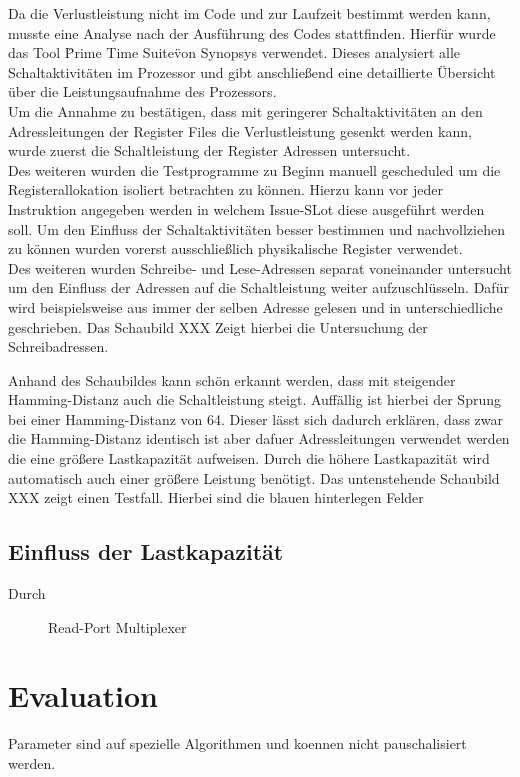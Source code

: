 Da die Verlustleistung nicht im Code und zur Laufzeit bestimmt werden kann, musste eine Analyse nach der Ausführung des Codes stattfinden. Hierfür wurde das Tool \"Prime Time Suite\" von Synopsys verwendet. Dieses analysiert alle Schaltaktivitäten im Prozessor und gibt anschließend eine detaillierte Übersicht über die Leistungsaufnahme des Prozessors.\\
Um die Annahme zu bestätigen, dass mit geringerer Schaltaktivitäten an den Adressleitungen der Register Files die Verlustleistung gesenkt werden kann, wurde zuerst die Schaltleistung der Register Adressen untersucht.\\
Des weiteren wurden die Testprogramme zu Beginn manuell gescheduled um die Registerallokation isoliert betrachten zu können. Hierzu kann vor jeder Instruktion angegeben werden in welchem Issue-SLot diese ausgeführt werden soll. Um den Einfluss der Schaltaktivitäten besser bestimmen und nachvollziehen zu können wurden vorerst ausschließlich physikalische Register verwendet. \\
Des weiteren wurden Schreibe- und Lese-Adressen separat voneinander untersucht um den Einfluss der Adressen auf die Schaltleistung weiter aufzuschlüsseln. Dafür wird beispielsweise aus immer der selben Adresse gelesen und in unterschiedliche geschrieben. Das Schaubild XXX Zeigt hierbei die Untersuchung der Schreibadressen.

%	
Anhand des Schaubildes kann schön erkannt werden, dass mit steigender Hamming-Distanz auch die Schaltleistung steigt. Auffällig ist hierbei der Sprung bei einer Hamming-Distanz von 64. Dieser lässt sich dadurch erklären, dass zwar die Hamming-Distanz identisch ist aber dafuer Adressleitungen verwendet werden die eine größere Lastkapazität aufweisen. Durch die höhere Lastkapazität wird automatisch auch einer größere Leistung benötigt.
Das untenstehende Schaubild XXX zeigt einen Testfall. Hierbei sind die blauen hinterlegen Felder 

\subsection{Einfluss der Lastkapazität}
Durch 
\begin{scriptsize}
	\begin{figure}[htbp] 
		\centering
		
		\caption{Read-Port Multiplexer}
		\label{fig:read_port_mux}
	\end{figure}
\end{scriptsize}

\section{Evaluation}
\label{sec:evalutation_verification}



Parameter sind auf spezielle Algorithmen und koennen nicht pauschalisiert werden.